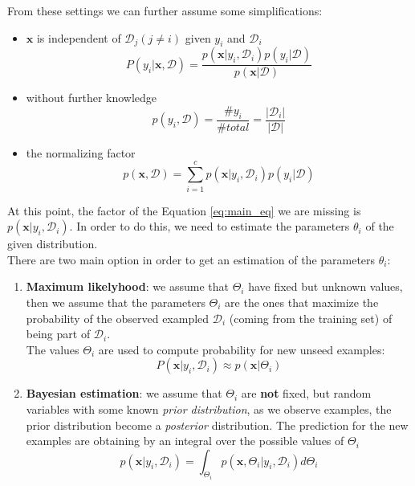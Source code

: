 From these settings we can further assume some simplifications: 
\begin{itemize}
    \item $\pmb{x}$ is independent of $\mathcal{D}_j (j \neq i)$ given $y_i$ and $\mathcal{D}_i$
    $$P(y_i|\pmb{x}, \mathcal{D}) = \frac{p(\pmb{x}|y_i, \mathcal{D}_i)p(y_i|\mathcal{D})}{p(\pmb{x}|\mathcal{D})}$$
    \item without further knowledge
    $$p(y_i, \mathcal{D}) = \frac{\#y_i}{\#total} = \frac{|\mathcal{D}_i|}{|\mathcal{D}|}$$
    \item the normalizing factor $$p(\pmb{x}, \mathcal{D}) = \sum_{i=1}^c p(\pmb{x}|y_i, \mathcal{D}_i)p(y_i|\mathcal{D})$$
\end{itemize}

At this point, the factor of the Equation \ref{eq:main_eq} we are missing is $p(\pmb{x}|y_i, \mathcal{D}_i)$. In order to do this, we need to estimate the parameters $\theta_i$ of the given distribution.\\
There are two main option in order to get an estimation of the parameters $\theta_i$:
\begin{enumerate}
    \item \textbf{Maximum likelyhood}: we assume that $\Theta_i$ have fixed but unknown values, then we assume that the parameters $\Theta_i$ are the ones that maximize the probability of the observed exampled $\mathcal{D}_i$ (coming from the training set) of being part of $\mathcal{D}_i$.\\
    The values $\Theta_i$ are used to compute probability for new unseed examples:
    $$P(\pmb{x}|y_i, \mathcal{D}_i) \approx p(\pmb{x}|\Theta_i)$$
    \item \textbf{Bayesian estimation}: we assume that $\Theta_i$ are \textbf{not} fixed, but random variables with some known \textit{prior distribution}, as we observe examples, the prior distribution become a \textit{posterior} distribution. The prediction for the new examples are obtaining by an integral over the possible values of $\Theta_i$
    $$p(\pmb{x}|y_i, \mathcal{D}_i) = \int_{\Theta_i} p(\pmb{x}, \Theta_i|y_i, \mathcal{D}_i) d\Theta_i$$
\end{enumerate}

